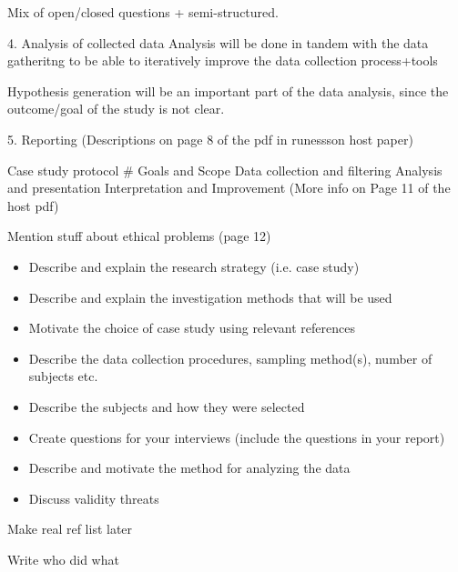 \documentclass[times, 10pt,twocolumn]{IEEEtran}
\begin{document}
Mix of open/closed questions + semi-structured. 




4. Analysis of collected data
Analysis will be done in tandem with the data gatheritng to be able to iteratively improve the data collection process+tools

Hypothesis generation will be an important part of the data analysis, since the outcome/goal of the study is not clear. 


5. Reporting
(Descriptions on page 8 of the pdf in runessson host paper)


Case study protocol
\#	Goals and Scope		Data collection and filtering	Analysis and presentation	Interpretation and Improvement
(More info on Page 11 of the host pdf)

Mention stuff about ethical problems (page 12)


\begin{itemize}
\item Describe and explain the research strategy (i.e. case study)
\item Describe and explain the investigation methods that will be used
\item Motivate the choice of case study using relevant references
\item Describe the data collection procedures, sampling method(s), number of subjects etc.
\item Describe the subjects and how they were selected
\item Create questions for your interviews (include the questions in your report)
\item Describe and motivate the method for analyzing the data
\item Discuss validity threats
\end{itemize}

Make real ref list later


Write who did what
\end{document}
